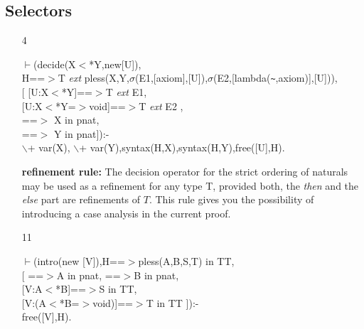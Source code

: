 \documentclass[11pt]{report}
\begin{document}
 \subsection{Selectors}
  
 \begin{enumerate}
 \item[4]
\begin{sf}\begin{tabbing}
$\vdash$(decide(X$<$*Y,new[U]),\\[-0.15ex]
\hspace{2em}H==$>$T \mbox{\it ext} pless(X,Y,$\sigma$(E1,[axiom],[U]),$\sigma$(E2,[lambda({\verb`~`},axiom)],[U])),\\[-0.15ex]
\hspace{2em}[ [U:X$<$*Y]==$>$T \mbox{\it ext} E1, \\[-0.15ex]
\hspace{2em}[U:X$<$*Y=$>$void]==$>$T \mbox{\it ext} E2 ,\\[-0.15ex]
\hspace{3em}==$>$ X in pnat,\\[-0.15ex]
\hspace{3em}==$>$ Y in pnat]):-\\[-0.15ex]
\hspace{2em}$\backslash$+ var(X), $\backslash$+ var(Y),syntax(H,X),syntax(H,Y),free([U],H).
\end{tabbing}\end{sf}

 {\bf refinement rule:}
 The decision operator for the strict ordering of naturals may be 
 used as a refinement for any type T, provided both, the \emph{then} 
 and the \emph{else} part are refinements of $T$. This rule gives
 you the possibility of introducing a case analysis in the
 current proof.   
  
 \item[11]
\begin{sf}\begin{tabbing}
$\vdash$(intro(new [V]),H==$>$pless(A,B,S,T) in TT,\\[-0.15ex]
\hspace{2em}[ ==$>$A in pnat, ==$>$B in pnat,\\[-0.15ex]
\hspace{3em}[V:A$<$*B]==$>$S in TT, \\[-0.15ex]
\hspace{3em}[V:(A$<$*B=$>$void)]==$>$T in TT ]):-\\[-0.15ex]
\hspace{2em}free([V],H). 
\end{tabbing}\end{sf}


\end{enumerate}
\end{document}
